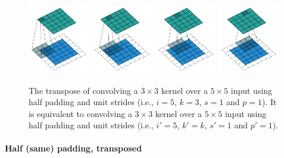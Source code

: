 \begin{figure}[p]
    \centering
    \includegraphics[width=0.24\textwidth]{pdf/same_padding_no_strides_transposed_00.pdf}
    \includegraphics[width=0.24\textwidth]{pdf/same_padding_no_strides_transposed_01.pdf}
    \includegraphics[width=0.24\textwidth]{pdf/same_padding_no_strides_transposed_02.pdf}
    \includegraphics[width=0.24\textwidth]{pdf/same_padding_no_strides_transposed_03.pdf}
    \caption{\label{fig:same_padding_no_strides_transposed} The transpose of
        convolving a $3 \times 3$ kernel over a $5 \times 5$ input using half
        padding and unit strides (i.e., $i = 5$, $k = 3$, $s = 1$ and $p = 1$).
        It is equivalent to convolving a $3 \times 3$ kernel over a $5 \times 5$
        input using half padding and unit strides (i.e., $i' = 5$, $k' = k$, $s'
        = 1$ and $p' = 1$).}
\end{figure}

\paragraph{Half (same) padding, transposed}

